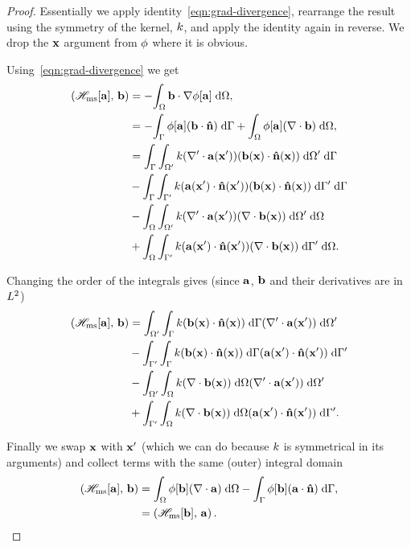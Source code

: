 \begin{proof}

  Essentially we apply identity~\cref{eqn:grad-divergence}, rearrange the result using the symmetry of the kernel, $\knl$, and apply the identity again in reverse. We drop the $\xv$ argument from $\phim$ where it is obvious.

  Using~\cref{eqn:grad-divergence} we get
  \begin{equation}
    \begin{aligned}
      \ip{\hmsop[\av]}{\bv} &= -\intd{\bv \cdot \grad \phim[\av] }, \\
      &= - \intb{\phim[\av] (\bv \cdot \nv)} + \intd{\phim[\av] (\div \bv) }, \\
      &= \intb{ \intd[\magd']{\knl (\nabla' \cdot \av(\xv')) (\bv(\xv) \cdot \nv(\xv))}} \\
      &- \intb{ \intd[\boundd']{\knl (\av(\xv') \cdot \nv(\xv')) (\bv(\xv) \cdot \nv(\xv))}} \\
      &- \intd{ \intd[\magd']{\knl (\nabla' \cdot \av(\xv')) (\div \bv(\xv))}} \\
      &+ \intd{ \intd[\boundd']{\knl (\av(\xv') \cdot \nv(\xv')) (\div \bv(\xv))}}.
    \end{aligned}
  \end{equation}

Changing the order of the integrals gives (since $\av$, $\bv$ and their derivatives are in $\ltwo$)
  \begin{equation}
    \begin{aligned}
      \ip{\hmsop[\av]}{\bv}
      &= \intd[\magd']{ \intb{\knl (\bv(\xv) \cdot \nv(\xv))} (\nabla' \cdot \av(\xv'))} \\
      &- \intd[\boundd']{ \intb{\knl (\bv(\xv) \cdot \nv(\xv))} (\av(\xv') \cdot \nv(\xv'))} \\
      &- \intd[\magd']{ \intd{\knl (\div \bv(\xv))} (\nabla' \cdot \av(\xv'))} \\
      &+ \intd[\boundd']{ \intd{\knl (\div \bv(\xv))} (\av(\xv') \cdot \nv(\xv'))}.
    \end{aligned}
  \end{equation}

  Finally we swap $\xv$ with $\xv'$ (which we can do because $\knl$ is symmetrical in its arguments) and collect terms with the same (outer) integral domain
  \begin{equation}
    \begin{aligned}
      \ip{\hmsop[\av]}{\bv} &= \intd{\phi[\bv] (\div \av)} - \intb{\phi[\bv] (\av \cdot \nv)}, \\
      & = \ip{\hmsop[\bv]}{\av}.
    \end{aligned}
  \end{equation}

\end{proof}


